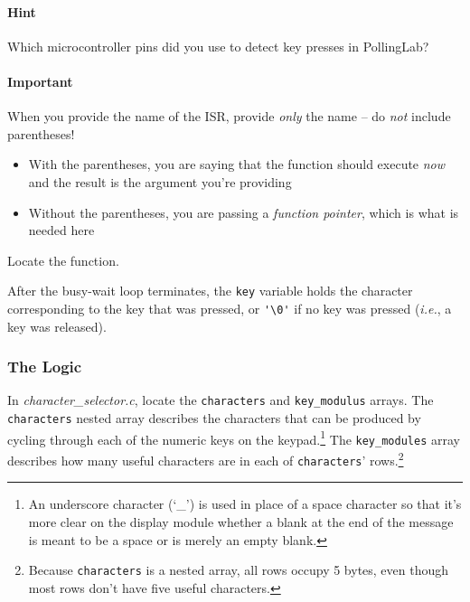 \paragraph{Hint} Which microcontroller pins did you use to detect key presses in PollingLab?
\paragraph{Important} When you provide the name of the ISR, provide \textit{only} the name -- do \textit{not} include parentheses!
\begin{itemize}
    \item With the parentheses, you are saying that the function should execute \textit{now} and the result is the argument you're providing
    \item Without the parentheses, you are passing a \textit{function pointer}, which is what is needed here \\
\end{itemize}

Locate the  function.

After the busy-wait loop terminates, the \lstinline{key} variable holds the character corresponding to the key that was pressed, or \lstinline{'\0'} if no key was pressed (\textit{i.e.}, a key was released).
\begin{description}
\end{description}

\subsubsection{The Logic} \label{subsubsec:logic}

In \textit{character\_selector.c}, locate the \lstinline{characters} and \lstinline{key_modulus} arrays.
The \lstinline{characters} nested array describes the characters that can be produced by cycling through each of the numeric keys on the keypad.\footnote{
    An underscore character (`\_') is used in place of a space character so that it's more clear on the display module whether a blank at the end of the message is meant to be a space or is merely an empty blank.
}
The \lstinline{key_modules} array describes how many useful characters are in each of \lstinline{characters}' rows.\footnote{
    Because \lstinline{characters} is a nested array, all rows occupy 5 bytes, even though most rows don't have five useful characters.
}

